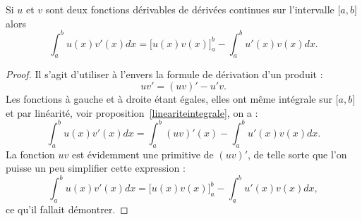 \begin{proposition}     \label{PROPooRLFIooQHnyJY}
    Si \( u\) et \( v\) sont deux fonctions dérivables de dérivées continues sur l'intervalle \( \mathopen[ a , b \mathclose]\) alors
    \begin{equation}        \label{EQooKISBooQvGMQT}
        \int_a^b u(x)v'(x)dx=\big[ u(x)v(x) \big]_a^b-\int_a^bu'(x)v(x)dx.
    \end{equation}
\end{proposition}

\begin{proof}
    Il s'agit d'utiliser à l'envers la formule de dérivation d'un produit :
    \begin{equation}
        uv'=(uv)'-u'v.
    \end{equation}
    Les fonctions à gauche et à droite étant égales, elles ont même intégrale sur \( \mathopen[ a , b \mathclose]\) et par linéarité, voir  proposition~\ref{lineariteintegrale}, on a :
    \begin{equation}
        \int_a^b u(x)v'(x)dx=\int_a^b (uv)'(x)-\int_a^b u'(x)v(x)dx.
    \end{equation}
    La fonction \( uv\) est évidemment une primitive de \( (uv)'\), de telle sorte que l'on puisse un peu simplifier cette expression :
    \begin{equation}
        \int_a^b u(x)v'(x)dx= \Big[ u(x)v(x) \Big]_a^b -\int_a^b u'(x)v(x)dx,
    \end{equation}
    ce qu'il fallait démontrer.
\end{proof}

